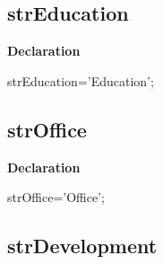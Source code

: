 \documentclass{report}
\newif\ifpdf
\begin{document}
\subsection*{strEducation}
\fi
\label{trstrings-strEducation}
\begin{list}{}{
\setlength{\itemindent}{0cm}
\setlength{\listparindent}{0cm}
\setlength{\leftmargin}{\evensidemargin}
\addtolength{\leftmargin}{\tmplength}
\settowidth{\labelsep}{X}
\addtolength{\leftmargin}{\labelsep}
\setlength{\labelwidth}{\tmplength}
}
\item[\textbf{Declaration}\hfill]
\ifpdf
\begin{flushleft}
\fi
\begin{ttfamily}
strEducation='Education';\end{ttfamily}

\ifpdf
\end{flushleft}
\fi

\end{list}
\ifpdf
\subsection*{\large{\textbf{strOffice}}\normalsize\hspace{1ex}\hrulefill}
\else
\subsection*{strOffice}
\fi
\label{trstrings-strOffice}
\begin{list}{}{
\setlength{\itemindent}{0cm}
\setlength{\listparindent}{0cm}
\setlength{\leftmargin}{\evensidemargin}
\addtolength{\leftmargin}{\tmplength}
\settowidth{\labelsep}{X}
\addtolength{\leftmargin}{\labelsep}
\setlength{\labelwidth}{\tmplength}
}
\item[\textbf{Declaration}\hfill]
\ifpdf
\begin{flushleft}
\fi
\begin{ttfamily}
strOffice='Office';\end{ttfamily}

\ifpdf
\end{flushleft}
\fi

\end{list}
\ifpdf
\subsection*{\large{\textbf{strDevelopment}}\normalsize\hspace{1ex}\hrulefill}
\else
\end{document}

